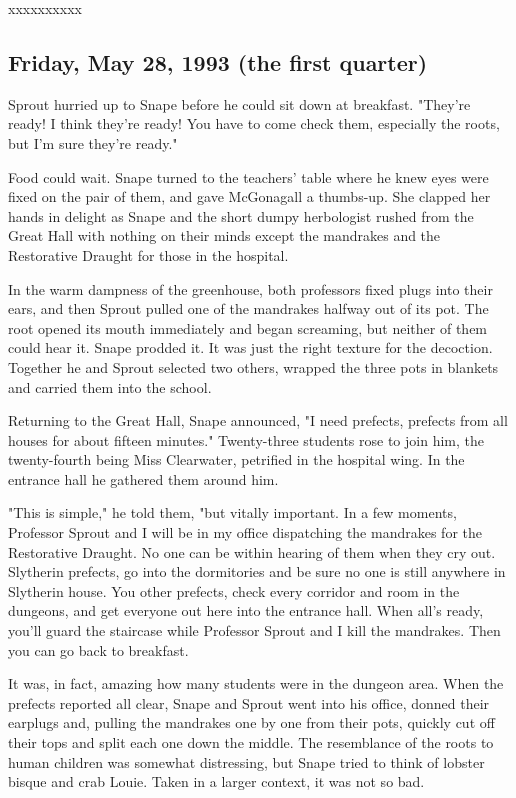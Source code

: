 \documentclass[a4paper,11pt]{article}
\begin{document}
xxxxxxxxxx

\subsection{Friday, May 28, 1993 (the first quarter)}

Sprout hurried up to Snape before he could sit down at breakfast. "They're ready! I think they're ready! You have to come check them, especially the roots, but I'm sure they're ready."

Food could wait. Snape turned to the teachers' table where he knew eyes were fixed on the pair of them, and gave McGonagall a thumbs-up. She clapped her hands in delight as Snape and the short dumpy herbologist rushed from the Great Hall with nothing on their minds except the mandrakes and the Restorative Draught for those in the hospital.

In the warm dampness of the greenhouse, both professors fixed plugs into their ears, and then Sprout pulled one of the mandrakes halfway out of its pot. The root opened its mouth immediately and began screaming, but neither of them could hear it. Snape prodded it. It was just the right texture for the decoction. Together he and Sprout selected two others, wrapped the three pots in blankets and carried them into the school.

Returning to the Great Hall, Snape announced, "I need prefects, prefects from all houses for about fifteen minutes." Twenty-three students rose to join him, the twenty-fourth being Miss Clearwater, petrified in the hospital wing. In the entrance hall he gathered them around him.

"This is simple," he told them, "but vitally important. In a few moments, Professor Sprout and I will be in my office dispatching the mandrakes for the Restorative Draught. No one can be within hearing of them when they cry out. Slytherin prefects, go into the dormitories and be sure no one is still anywhere in Slytherin house. You other prefects, check every corridor and room in the dungeons, and get everyone out here into the entrance hall. When all's ready, you'll guard the staircase while Professor Sprout and I kill the mandrakes. Then you can go back to breakfast.

It was, in fact, amazing how many students were in the dungeon area. When the prefects reported all clear, Snape and Sprout went into his office, donned their earplugs and, pulling the mandrakes one by one from their pots, quickly cut off their tops and split each one down the middle. The resemblance of the roots to human children was somewhat distressing, but Snape tried to think of lobster bisque and crab Louie. Taken in a larger context, it was not so bad.
\end{document}
